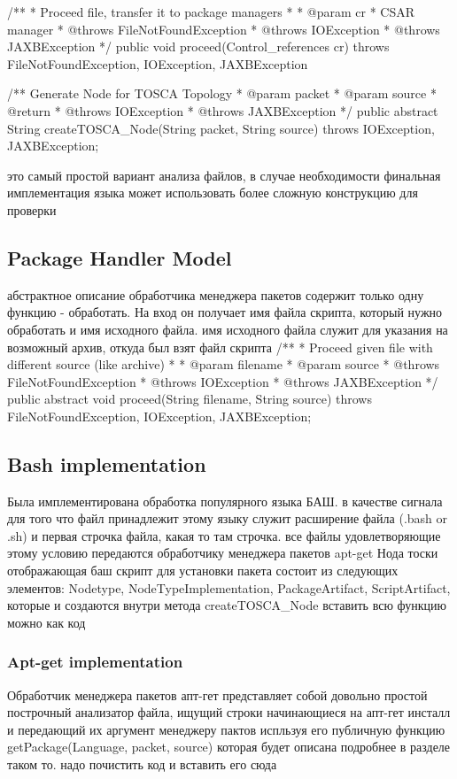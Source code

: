 /**
* Proceed file, transfer it to package managers
* 
* @param cr
*            CSAR manager
* @throws FileNotFoundException
* @throws IOException
* @throws JAXBException
*/
public void proceed(Control_references cr) throws FileNotFoundException,
IOException, JAXBException {
	
	/**	Generate Node for TOSCA Topology
	* @param packet
	* @param source
	* @return
	* @throws IOException
	* @throws JAXBException
	*/
	public abstract String createTOSCA_Node(String packet, String source) throws IOException, JAXBException;
	
	это самый простой вариант анализа файлов, в случае необходимости финальная имплементация языка может использовать более сложную конструкцию для проверки
\fi
\subsection*{Package Handler Model}
абстрактное описание обработчика менеджера пакетов содержит только одну функцию - обработать. 
На вход он получает имя файла скрипта, который нужно обработать и имя исходного файла. имя исходного файла служит для указания на возможный архив, откуда был взят файл скрипта
	/**
* Proceed given file with different source (like archive)
* 
* @param filename
* @param source
* @throws FileNotFoundException
* @throws IOException
* @throws JAXBException
*/
public abstract void proceed(String filename, String source) throws FileNotFoundException, IOException, JAXBException;
\fi
\subsection*{Bash implementation}
Была имплементирована обработка популярного языка БАШ. 
в качестве сигнала для того что файл принадлежит этому языку служит расширение файла (.bash or .sh) и первая строчка файла, какая то там строчка.
все файлы удовлетворяющие этому условию передаются обработчику менеджера пакетов apt-get
Нода тоски отображающая баш скрипт для установки пакета состоит из следующих элементов:
Nodetype, NodeTypeImplementation, PackageArtifact, ScriptArtifact, которые и создаются внутри метода createTOSCA_Node
вставить всю функцию можно как код
\fi
\subsubsection*{Apt-get implementation}
Обработчик менеджера пакетов апт-гет представляет собой довольно простой построчный анализатор файла, ищущий строки начинающиеся на апт-гет инсталл и передающий их аргумент менеджеру пактов испльзуя его публичную функцию getPackage(Language, packet, source)
которая будет описана подробнее в разделе таком то. 
надо почистить код и вставить его сюда
\fi
}
